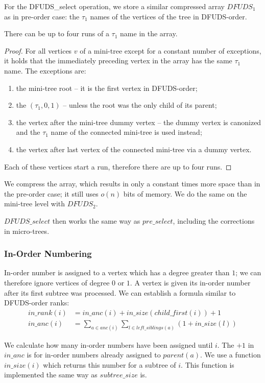 For the DFUDS\_select operation, we store a similar compressed array $DFUDS_1$ as in pre-order case: the $\tau_1$ names of the vertices of the tree in DFUDS-order.
\begin{lemma}
	There can be up to four runs of a $\tau_1$ name in the array.
\end{lemma}
\begin{proof}
	For all vertices $v$ of a mini-tree except for a constant number of exceptions, it holds that the immediately preceding vertex in the array has the same $\tau_1$ name.
	The exceptions are:
	\begin{enumerate}
		\item the mini-tree root -- it is the first vertex in DFUDS-order;
		\item the $(\tau_1, 0, 1)$ -- unless the root was the only child of its parent;
		\item the vertex after the mini-tree dummy vertex -- the dummy vertex is canonized and the $\tau_1$ name of the connected mini-tree is used instead;
		\item the vertex after last vertex of the connected mini-tree via a dummy vertex.
	\end{enumerate}
	Each of these vertices start a run, therefore there are up to four runs.
\end{proof}
We compress the array, which results in only a constant times more space than in the pre-order case; it still uses $o(n)$ bits of memory.
We do the same on the mini-tree level with $DFUDS_2$.

$DFUDS\_select$ then works the same way as $pre\_select$, including the corrections in micro-trees.

\subsubsection{In-Order Numbering}

In-order number is assigned to a vertex which has a degree greater than $1$; we can therefore ignore vertices of degree $0$ or $1$.
A vertex is given its in-order number after its first subtree was processed.
We can establish a formula similar to DFUDS-order ranks:
\begin{align*}
	in\_rank(i) &= in\_anc(i) + in\_size(child\_first(i)) + 1 \\
	in\_anc(i) &= \sum_{a \in anc(i)} \sum_{l \in left\_siblings(a)} (1 + in\_size(l))
\end{align*}

We calculate how many in-order numbers have been assigned until $i$.
The $+1$ in $in\_anc$ is for in-order numbers already assigned to $parent(a)$.
We use a function $in\_size(i)$ which returns this number for a subtree of $i$.
This function is implemented the same way as $subtree\_size$ is.

